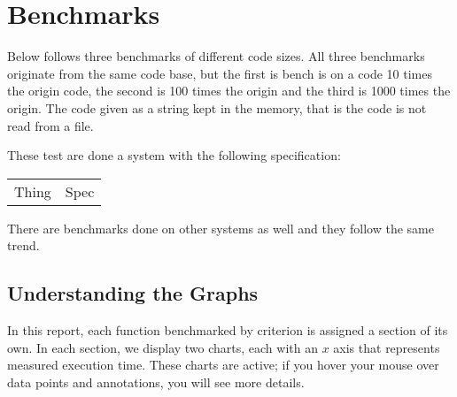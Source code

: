 
\chapter{Benchmarks}
Below follows three benchmarks of different code sizes. All three benchmarks 
originate from the same code base, but the first is bench is on a code 10 times
the origin code, the second is 100 times the origin and the third is 1000 times
the origin. The code given as a string kept in the memory, that is the code is
not read from a file.

These test are done a system with the following specification:
\begin{center}
\begin{tabular}{l l}
Thing & Spec
\end{tabular}
\end{center}
There are benchmarks done on other systems as well and they follow the same trend.





\section*{Understanding the Graphs}
In this report, each function benchmarked by criterion is assigned
a section of its own.  In each section, we display two charts, each
with an $x$ axis that represents measured execution time.
These charts are active; if you hover your mouse over data points
and annotations, you will see more details.

